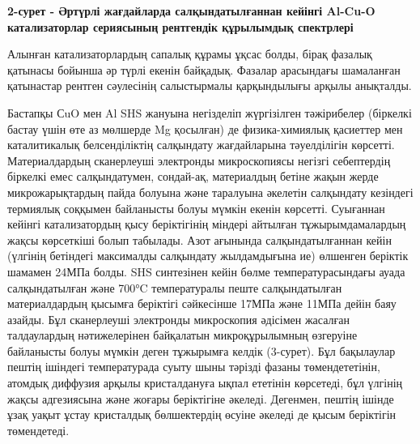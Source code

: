 {\bfseries 2-сурет - Әртүрлі жағдайларда салқындатылғаннан кейінгі Al-Cu-O
катализаторлар сериясының рентгендік құрылымдық спектрлері}

Алынған катализаторлардың сапалық құрамы ұқсас болды, бірақ фазалық
қатынасы бойынша әр түрлі екенін байқадық. Фазалар арасындағы шамаланған
қатынастар рентген сәулесінің салыстырмалы қарқындылығы арқылы
анықталды.

Бастапқы СuO мен Al SHS жануына негізделіп жүргізілген тәжірибелер
(біркелкі бастау үшін өте аз мөлшерде Mg қосылған) де физика-химиялық
қасиеттер мен каталитикалық белсенділіктің салқындату жағдайларына
тәуелділігін көрсетті. Материалдардың сканерлеуші электронды
микроскопиясы негізгі себептердің біркелкі емес салқындатумен,
сондай-ақ, материалдың бетіне жақын жерде микрожарықтардың пайда болуына
және таралуына әкелетін салқындату кезіндегі термиялық соққымен
байланысты болуы мүмкін екенін көрсетті. Суығаннан кейінгі
катализатордың қысу беріктігінің міндері айтылған тұжырымдамалардың
жақсы көрсеткіші болып табылады. Азот ағынында салқындатылғаннан кейін
(үлгінің бетіндегі максималды салқындату жылдамдығына ие) өлшенген
беріктік шамамен 24МПа болды. SHS синтезінен кейін бөлме
температурасындағы ауада салқындатылған және 700°C температуралы пеште
салқындатылған материалдардың қысымға беріктігі сәйкесінше 17МПа және
11МПа дейін баяу азайды. Бұл сканерлеуші электронды микроскопия әдісімен
жасалған талдаулардың нәтижелерінен байқалатын микроқұрылымның өзгеруіне
байланысты болуы мүмкін деген тұжырымға келдік (3-сурет). Бұл бақылаулар
пештің ішіндегі температурада суыту шыны тәрізді фазаны төмендететінін,
атомдық диффузия арқылы кристалдануға ықпал ететінін көрсетеді, бұл
үлгінің жақсы адгезиясына және жоғары беріктігіне әкеледі. Дегенмен,
пештің ішінде ұзақ уақыт ұстау кристалдық бөлшектердің өсуіне әкеледі де
қысым беріктігін төмендетеді.

